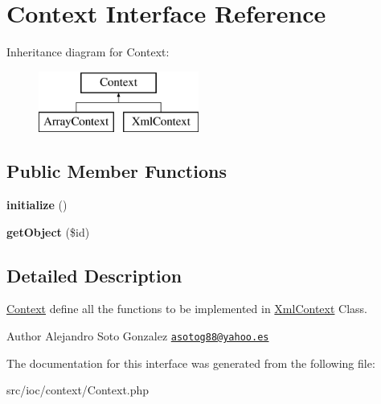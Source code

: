 \hypertarget{interface_context}{\section{Context Interface Reference}
\label{interface_context}
}
Inheritance diagram for Context\-:\begin{figure}[H]
\begin{center}
\leavevmode
\includegraphics[height=2.000000cm]{interface_context}
\end{center}
\end{figure}
\subsection*{Public Member Functions}
\begin{DoxyCompactItemize}
\item 
\hypertarget{interface_context_a91098fa7d1917ce4833f284bbef12627}{{\bfseries initialize} ()}\label{interface_context_a91098fa7d1917ce4833f284bbef12627}

\item 
\hypertarget{interface_context_a0e46ac0cbdb26af9e74a946c6a7c0e5e}{{\bfseries get\-Object} (\$id)}\label{interface_context_a0e46ac0cbdb26af9e74a946c6a7c0e5e}

\end{DoxyCompactItemize}


\subsection{Detailed Description}
\hyperlink{interface_context}{Context} define all the functions to be implemented in \hyperlink{class_xml_context}{Xml\-Context} Class.

\begin{DoxyAuthor}{Author}
Alejandro Soto Gonzalez \href{mailto:asotog88@yahoo.es}{\tt asotog88@yahoo.\-es} 
\end{DoxyAuthor}


The documentation for this interface was generated from the following file\-:\begin{DoxyCompactItemize}
\item 
src/ioc/context/Context.\-php\end{DoxyCompactItemize}
